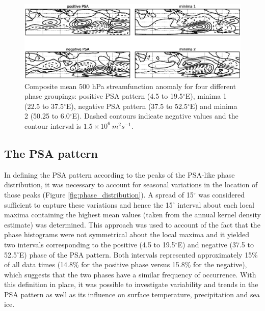 \begin{figure}
\begin{center}
\includegraphics[width=1\columnwidth]{figures/psa/psa-phase-composites_wave6_ERAInterim_500hPa-lat10S10Nmean-lon115E235Ezeropad_030day-runmean-anom-wrt-all_native-np20N260E.eps}
\caption[Composite mean 500 hPa streamfunction anomaly for various phase groupings]{\label{fig:sf_composites}
Composite mean 500 hPa streamfunction anomaly for four different phase groupings: positive PSA pattern (4.5 to 19.5$^{\circ}$E), minima 1 (22.5 to 37.5$^{\circ}$E), negative PSA pattern (37.5 to 52.5$^{\circ}$E) and minima 2 (50.25 to 6.0$^{\circ}$E). Dashed contours indicate negative values and the contour interval is $1.5 \times 10^6 \: m^2 s^{-1}$.%
}
\end{center}
\end{figure}


\subsection{The PSA pattern}\label{s:psa_results}

In defining the PSA pattern according to the peaks of the PSA-like phase distribution, it was necessary to account for seasonal variations in the location of those peaks (Figure \ref{fig:phase_distribution}). A spread of 15$^{\circ}$ was considered sufficient to capture these variations and hence the 15$^{\circ}$ interval about each local maxima containing the highest mean values (taken from the annual kernel density estimate) was determined. This approach was used to account of the fact that the phase histograms were not symmetrical about the local maxima and it yielded two intervals corresponding to the positive (4.5 to 19.5$^{\circ}$E) and negative (37.5 to 52.5$^{\circ}$E) phase of the PSA pattern. Both intervals represented approximately 15\% of all data times (14.8\% for the positive phase versus 15.8\% for the negative), which suggests that the two phases have a similar frequency of occurrence. With this definition in place, it was possible to investigate variability and trends in the PSA pattern as well as its influence on surface temperature, precipitation and sea ice. 

